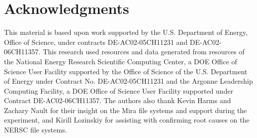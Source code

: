 \section*{Acknowledgments}

This material is based upon work supported by the U.S. Department of Energy,
Office of Science, under contracts DE-AC02-05CH11231 and DE-AC02-06CH11357.
This research used resources and data generated from resources of the
National Energy Research Scientific Computing Center, a DOE Office of
Science
User Facility supported by the Office of Science of the U.S. Department of
Energy under Contract No. DE-AC02-05CH11231 and the Argonne Leadership
Computing Facility, a DOE Office of Science User Facility supported under
Contract DE-AC02-06CH11357.
The authors also  thank Kevin Harms and Zachary Nault for their insight on the Mira file systems and support during the experiment, and Kirill Lozinskiy for assisting with confirming root causes on the NERSC file systems.